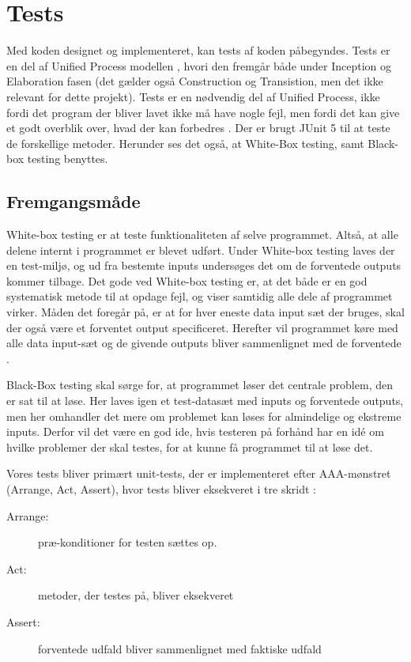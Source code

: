\chapter{Tests}\label{ch:tests}
Med koden designet og implementeret, kan tests af koden påbegyndes. Tests er en del af Unified Process modellen \cite{UnifiedProcess}, hvori den fremgår både under Inception og Elaboration fasen (det gælder også Construction og Transistion, men det ikke relevant for dette projekt). Tests er en nødvendig del af Unified Process, ikke fordi det program der bliver lavet ikke må have nogle fejl, men fordi det kan give et godt overblik over, hvad der kan forbedres \cite{sestoft2008systematic}. Der er brugt JUnit 5\cite{JUnit} til at teste de forskellige metoder. Herunder ses det også, at White-Box testing, samt Black-box testing benyttes. 

\section{Fremgangsmåde}
White-box testing er at teste funktionaliteten af selve programmet. Altså, at alle delene internt i programmet er blevet udført. Under White-box testing laves der en test-miljø, og ud fra bestemte inputs undersøges det om de forventede outputs kommer tilbage. Det gode ved White-box testing er, at det både er en god systematisk metode til at opdage fejl, og viser samtidig alle dele af programmet virker. Måden det foregår på, er at for hver eneste data input sæt der bruges, skal der også være et forventet output specificeret. Herefter vil programmet køre med alle data input-sæt og de givende outputs bliver sammenlignet med de forventede \cite{sestoft2008systematic}.

Black-Box testing skal sørge for, at programmet løser det centrale problem, den er sat til at løse. Her laves igen et test-datasæt med inputs og forventede outputs, men her omhandler det mere om problemet kan løses for almindelige og ekstreme inputs. Derfor vil det være en god ide, hvis testeren på forhånd har en idé om hvilke problemer der skal testes, for at kunne få programmet til at løse det\cite{sestoft2008systematic}. 

Vores tests bliver primært unit-tests, der er implementeret efter AAA-mønstret (Arrange, Act, Assert), hvor tests bliver eksekveret i tre skridt \cite{ArrangeActAssert}:
\begin{description}
    \item[Arrange:] præ-konditioner for testen sættes op.
    \item[Act:] metoder, der testes på, bliver eksekveret
    \item[Assert:] forventede udfald bliver sammenlignet med faktiske udfald 
\end{description}

